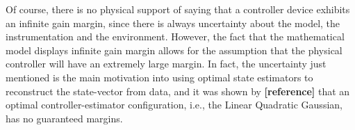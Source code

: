 \documentclass[a4paper,11pt]{book}
\numberwithin{figure}{chapter}
\numberwithin{equation}{chapter}
\numberwithin{table}{chapter}
\theoremstyle{definition}
\begin{document}
Of course, there is no physical support of saying that a controller device exhibits an infinite gain margin, since there is always uncertainty about the model, the instrumentation and the environment. However, the fact that the mathematical model displays infinite gain margin allows for the assumption that the physical controller will have an extremely large margin. In fact, the uncertainty just mentioned is the main motivation into using optimal state estimators to reconstruct the state-vector from data, and it was shown by \textbf{[reference]} that an optimal controller-estimator configuration, i.e., the Linear Quadratic Gaussian, has no guaranteed margins.

%
%
%
%
\end{document}
